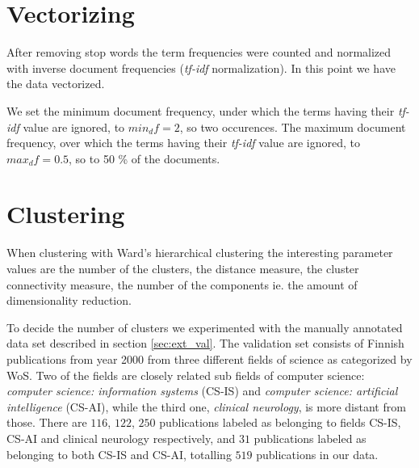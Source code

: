 \section{Vectorizing}
After removing stop words the term frequencies were counted and 
normalized with inverse document frequencies (\emph{tf-idf} 
normalization). 
In this point we have the data vectorized.

We set the minimum document frequency, under which the terms 
having their \emph{tf-idf} value are ignored, to $min_df=2$, so 
two occurences. The maximum document frequency, over which the 
terms having their \emph{tf-idf} value are ignored, to 
$max_df=0.5$, so to 50 \% of the documents.



\section{Clustering}
When clustering with Ward's hierarchical clustering the 
interesting parameter values are the number of the clusters, 
the distance measure, the cluster connectivity measure, the 
number of the components ie. the amount of dimensionality 
reduction. 

To decide the number of clusters we experimented with the manually 
annotated data set described in section \ref{sec:ext_val}.
The validation set consists of Finnish publications from year 2000
from three different fields of science as categorized by WoS.
Two of the fields are closely related sub fields of computer
science: \emph{computer science: information systems} (CS-IS) and 
\emph{computer science: 
artificial intelligence} (CS-AI), while the third one, 
\emph{clinical neurology}, is more distant from those. There are 
$116$, $122$, $250$ publications labeled as belonging to fields 
CS-IS, CS-AI and clinical neurology respectively, and $31$ 
publications labeled as belonging to both CS-IS and CS-AI, 
totalling $519$ publications in our data.

